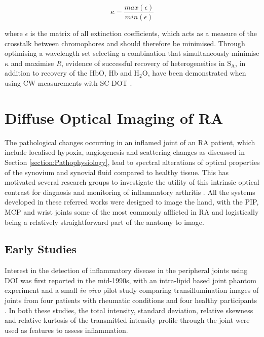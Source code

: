 \documentclass[twoside]{bhamthesis}
\theoremstyle{definition}
\begin{document}
\begin{equation}
\kappa = \frac{max\left( \textbf{$\epsilon$} \right)} {min\left( \textbf{$\epsilon$} \right)}
  \label{eqn:Lambert-Bouger}
\end{equation}

where $\textbf{$\epsilon$}$ is the matrix of all extinction coefficients, which acts as a measure of the crosstalk between chromophores and should therefore be minimised. Through optimising a wavelength set selecting a combination that simultaneously minimise $\kappa$ and maximise \textit{R}, evidence of successful recovery of heterogeneities in $\mathrm{S_A}$, in addition to recovery of the HbO, Hb and $\mathrm{H_2O}$, have been demonstrated when using CW measurements with SC-DOT  \cite{corlu2005diffuse,eames2008wavelength}. 

\section{Diffuse Optical Imaging of RA}


\label{section:Optical_Imaging_of_Arthritis}

The pathological changes occurring in an inflamed joint of an RA patient, which include localised hypoxia, angiogenesis and scattering changes as discussed in Section 
\ref{section:Pathophysiology}, lead to spectral alterations of optical properties of the synovium and synovial fluid compared to healthy tissue. This has motivated several research groups to investigate the utility of this intrinsic optical contrast for diagnosis and monitoring of inflammatory arthritis \cite{hielscher2004sagittal,beuthan2007ra,minet2007analysis,meier2012potential}.  
All the systems developed in these referred works were designed to image the hand, with the PIP, MCP and wrist joints some of the most commonly afflicted in RA \cite{harris2005clinical} and logistically being a relatively straightforward part of the anatomy to image.

\subsection{Early Studies}

Interest in the detection of inflammatory disease in the peripheral joints using DOI was first reported in the mid-1990s, with an intra-lipid based joint phantom experiment \cite{prapavat1995evaluation} and a small \textit{in vivo} pilot study comparing transillumination images of joints from four patients with rheumatic conditions and four healthy participants \cite{prapavat1995vivo}. In both these studies, the total intensity, standard deviation, relative skewness and relative kurtosis of the transmitted intensity profile through the joint were used as features to assess inflammation. 
\end{document}
